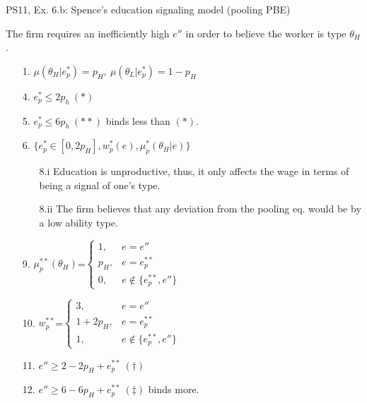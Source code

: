 \begin{frame}{PS11, Ex. 6.b: Spence’s education signaling model (pooling PBE)}
\begin{multicols}{2}
\begin{itemize}
      \end{itemize}\vspace{-8pt}
      The firm requires an inefficiently high $e''$ in order to believe the worker is type $\theta_H$.
      \vfill\null\columnbreak
      \begin{enumerate}
        \item[1.] $\mu\left(\theta_H|e_p^*\right)=p_H,\
               \mu\left(\theta_L|e_p^*\right)=1-p_H$
        \item[4.] $e_p^*\leq2p_h\ (*)$
        \item[5.] $e_p^*\leq6p_h\ (**)$ binds less than $(*)$.
        \item[6.] $\{e_p^*\in[0,2p_H],w_p^*(e),\mu_p^*(\theta_H|e)\}$
        \begin{itemize}\normalsize
          \item[8.i] Education is unproductive, thus, it only affects the wage in terms of being a signal of one's type.
          \item[8.ii] The firm believes that any deviation from the pooling eq. would be by a low ability type.
        \end{itemize}
        \item[9.] $\mu_p^{**}(\theta_H)$=$\left\{\begin{array}{rl}
                      1, & e = e'' \\
                      p_H, & e = e_p^{**} \\
                      0, & e \notin \{e_p^{**},e''\}
                    \end{array}\right.$
        \item[10.] $w_p^{**}$=$\left\{\begin{array}{rl}
                      3, & e = e'' \\
                      1+2p_H, & e = e_p^{**} \\
                      1, & e \notin \{e_p^{**},e''\}
                    \end{array}\right.$
        \item[11.] $e'' \geq 2-2p_H+e_p^{**}\ (\dagger)$
        \item[12.] $e'' \geq 6-6p_H+e_p^{**}\ (\ddagger)$ binds more.
      \end{enumerate}
      \vfill\null
    \end{multicols}
\end{frame}


